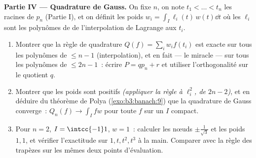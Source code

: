 \begin{problem}
\medskip
\noindent\textbf{Partie IV --- Quadrature de Gauss.} On fixe
$n$, on note $t_1 < \dots < t_n$ les racines de $p_n$ (Partie
I), et on définit les poids $w_i = \int_I \ell_i(t)\,w(t)\dd
t$ où les $\ell_i$ sont les polynômes de  de l'interpolation
de Lagrange aux $t_i$.
\begin{enumerate}[resume]
  \item Montrer que la règle de quadrature $Q(f) =
        \sum_iw_if(t_i)$ est exacte sur tous les polynômes de
         $\leq n - 1$ (interpolation), et en fait --- le
        miracle --- sur tous les polynômes de  $\leq 2n
        - 1$~: écrire $P = qp_n + r$ et utiliser
        l'orthogonalité sur le quotient $q$.
  \item Montrer que les poids sont positifs \emph{(appliquer
        la règle à $\ell_i^2$, de  $2n - 2$)}, et en
        déduire du théorème de Polya
        (\cref{exo:b3:banach:9}) que la quadrature de Gauss
        converge~: $Q_n(f) \to \int_I fw$ pour toute $f$
         sur un $I$ compact.
  \item Pour $n = 2$, $I = \intcc{-1}1$, $w = 1$~: calculer
        les nœuds $\pm\frac1{\sqrt3}$ et les poids $1, 1$, et
        vérifier l'exactitude sur $1, t, t^2, t^3$ à la main.
        Comparer avec la règle des trapèzes sur les mêmes
        deux points d'évaluation.
\end{enumerate}


\end{problem}

